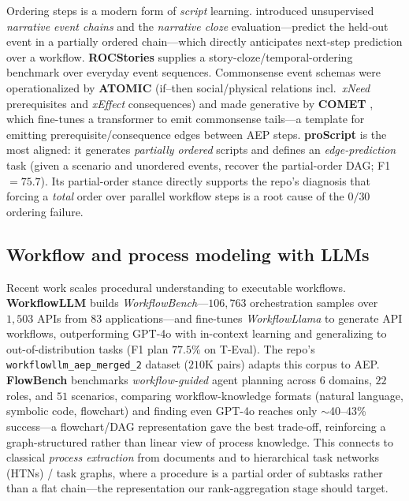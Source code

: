 Ordering steps is a modern form of \emph{script} learning.
\citet{proc:chambers2008narrative} introduced unsupervised \emph{narrative
event chains} and the \emph{narrative cloze} evaluation---predict the held-out
event in a partially ordered chain---which directly anticipates next-step
prediction over a workflow. \textbf{ROCStories}
\citep{proc:mostafazadeh2016story} supplies a story-cloze/temporal-ordering
benchmark over everyday event sequences. Commonsense event schemas were
operationalized by \textbf{ATOMIC} \citep{proc:sap2019atomic}
(if--then social/physical relations incl.\ \emph{xNeed} prerequisites and
\emph{xEffect} consequences) and made generative by \textbf{COMET}
\citep{proc:bosselut2019comet}, which fine-tunes a transformer to emit
commonsense tails---a template for emitting prerequisite/consequence edges
between AEP steps. \textbf{proScript} \citep{proc:sakaguchi2021proscript} is the
most aligned: it generates \emph{partially ordered} scripts and defines an
\emph{edge-prediction} task (given a scenario and unordered events, recover the
partial-order DAG; F1$=75.7$). Its partial-order stance directly supports the
repo's diagnosis that forcing a \emph{total} order over parallel workflow steps
is a root cause of the $0/30$ ordering failure.

\subsection{Workflow and process modeling with LLMs}

Recent work scales procedural understanding to executable workflows.
\textbf{WorkflowLLM} \citep{proc:fan2024workflowllm} builds
\emph{WorkflowBench}---$106{,}763$ orchestration samples over $1{,}503$ APIs
from $83$ applications---and fine-tunes \emph{WorkflowLlama} to generate API
workflows, outperforming GPT-4o with in-context learning and generalizing to
out-of-distribution tasks (F1 plan $77.5\%$ on T-Eval). The repo's
\texttt{workflowllm\_aep\_merged\_2} dataset ($210$K pairs) adapts this corpus
to AEP. \textbf{FlowBench} \citep{proc:xiao2024flowbench} benchmarks
\emph{workflow-guided} agent planning across $6$ domains, $22$ roles, and $51$
scenarios, comparing workflow-knowledge formats (natural language, symbolic
code, flowchart) and finding even GPT-4o reaches only $\sim$40--43\% success---a
flowchart/DAG representation gave the best trade-off, reinforcing a
graph-structured rather than linear view of process knowledge. This connects to
classical \emph{process extraction} from documents and to hierarchical task
networks (HTNs) / task graphs, where a procedure is a partial order of subtasks
rather than a flat chain---the representation our rank-aggregation stage should
target.

